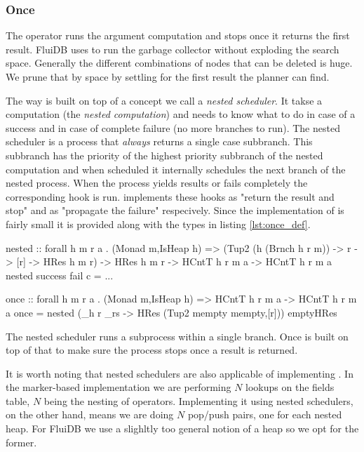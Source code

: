 \subsubsection{Once}

The  operator runs the argument computation and stops once it
returns the first result. FluiDB uses  to run the garbage
collector without exploding the search space. Generally the different
combinations of nodes that can be deleted is huge. We prune that by
space by settling for the first result the planner can find.

The way  is built on top of a concept we call a
\emph{nested scheduler}. It takse a computation (the \emph{nested
  computation}) and needs to know what to do in case of a success and
in case of complete failure (no more branches to run). The nested
scheduler is a process that \emph{always} returns a single case
subbranch. This subbranch has the priority of the highest priority
subbranch of the nested computation and when scheduled it internally
schedules the next branch of the nested process. When the process
yields results or fails completely the corresponding hook is
run.  implements these hooks as "return the result and
stop" and as "propagate the failure" respecively. Since the
implementation of  is fairly small it is provided along
with the types in listing \ref{lst:once_def}.

\begin{code}
\begin{haskellcode}
nested
  :: forall h m r a .
  (Monad m,IsHeap h)
  => (Tup2 (h (Brnch h r m)) -> r -> [r] -> HRes h m r)
  -> HRes h m r
  -> HCntT h r m a
  -> HCntT h r m a
nested success fail c = ...

once :: forall h m r a . (Monad m,IsHeap h) => HCntT h r m a -> HCntT h r m a
once = nested (\_h r _rs -> HRes (Tup2 mempty mempty,[r])) emptyHRes
\end{haskellcode}
\caption{\label{lst:once_def}The nested scheduler runs a subprocess within a single branch. Once is built on top of that to make sure the process stops once a result is returned.}
\end{code}


It is worth noting that nested schedulers are also applicable of
implementing \hask{<//>}. In the marker-based implementation we are
performing \(N\) lookups on the fields table, \(N\) being the nesting
of \hask{<//>} operators. Implementing it using nested schedulers, on the
other hand, means we are doing \(N\) pop/push pairs, one for each
nested heap. For FluiDB we use a slighltly too general notion of a
heap so we opt for the former.
